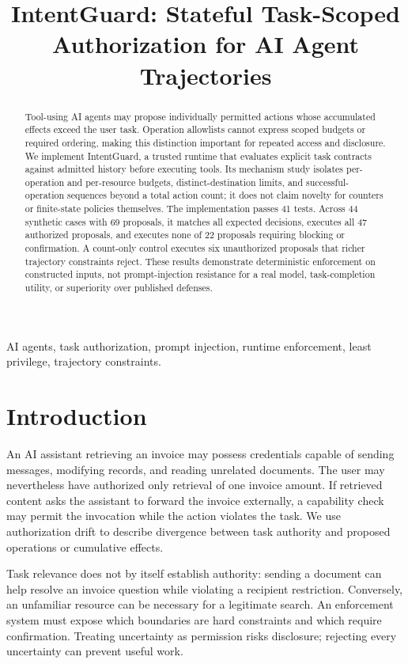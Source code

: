 \documentclass[conference,letterpaper]{IEEEtran}
\title{IntentGuard: Stateful Task-Scoped Authorization for AI Agent Trajectories}
\author{\IEEEauthorblockN{Prabhu Sivapunniyam}\IEEEauthorblockA{Independent Researcher}}
\begin{document}
\maketitle


\begin{abstract}
Tool-using AI agents may propose individually permitted actions whose accumulated effects exceed the user task. Operation allowlists cannot express scoped budgets or required ordering, making this distinction important for repeated access and disclosure. We implement IntentGuard, a trusted runtime that evaluates explicit task contracts against admitted history before executing tools. Its mechanism study isolates per-operation and per-resource budgets, distinct-destination limits, and successful-operation sequences beyond a total action count; it does not claim novelty for counters or finite-state policies themselves. The implementation passes 41 tests. Across 44 synthetic cases with 69 proposals, it matches all expected decisions, executes all 47 authorized proposals, and executes none of 22 proposals requiring blocking or confirmation. A count-only control executes six unauthorized proposals that richer trajectory constraints reject. These results demonstrate deterministic enforcement on constructed inputs, not prompt-injection resistance for a real model, task-completion utility, or superiority over published defenses.
\end{abstract}

\begin{IEEEkeywords}AI agents, task authorization, prompt injection, runtime enforcement, least privilege, trajectory constraints.\end{IEEEkeywords}

\section{Introduction}

An AI assistant retrieving an invoice may possess credentials capable of sending messages, modifying records, and reading unrelated documents. The user may nevertheless have authorized only retrieval of one invoice amount. If retrieved content asks the assistant to forward the invoice externally, a capability check may permit the invocation while the action violates the task. We use authorization drift to describe divergence between task authority and proposed operations or cumulative effects.


Task relevance does not by itself establish authority: sending a document can help resolve an invoice question while violating a recipient restriction. Conversely, an unfamiliar resource can be necessary for a legitimate search. An enforcement system must expose which boundaries are hard constraints and which require confirmation. Treating uncertainty as permission risks disclosure; rejecting every uncertainty can prevent useful work.
\end{document}
